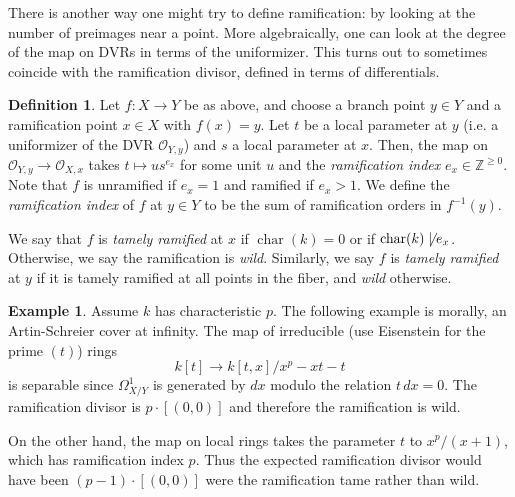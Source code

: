 \documentclass[10pt]{article}
\theoremstyle{definition}
\newtheorem{exmp}[thm]{Example}
\newtheorem{defn}[thm]{Definition}
\DeclareMathOperator{\kchar}{char}
\newcommand{\G}{\mathbb{G}}
\newcommand{\OO}{\mathcal{O}}
\begin{document}
There is another way one might try to define ramification: by looking at the number of preimages near a point.  More algebraically, one can look at the degree of the map on DVRs in terms of the uniformizer.  This turns out to sometimes coincide with the ramification divisor, defined in terms of differentials.
\begin{defn}
Let $f: X \rightarrow Y$ be as above, and choose a branch point $y \in Y$ and a ramification point $x \in X$ with $f(x) = y$.  Let $t$ be a local parameter at $y$ (i.e. a uniformizer of the DVR $\OO_{Y,y}$) and $s$ a local parameter at $x$.  Then, the map on $\OO_{Y,y} \rightarrow \OO_{X,x}$ takes $t \mapsto us^{e_x}$ for some unit $u$ and the \emph{ramification index} $e_x \in \mathbb{Z}^{\geq 0}$.  Note that $f$ is unramified if $e_x = 1$ and ramified if $e_x > 1$.  We define the \emph{ramification index} of $f$ at $y \in Y$ to be the sum of ramification orders in $f^{-1}(y)$.  

We say that $f$ is \emph{tamely ramified} at $x$ if $\kchar(k) = 0$ or if $\kchar(k) \not\mid e_x$.  Otherwise, we say the ramification is \emph{wild}.  Similarly, we say $f$ is \emph{tamely ramified} at $y$ if it is tamely ramified at all points in the fiber, and \emph{wild} otherwise.
\end{defn}


\begin{exmp}
Assume $k$ has characteristic $p$.  The following example is morally, an Artin-Schreier cover at infinity.  The map of irreducible (use Eisenstein for the prime $(t)$) rings 
$$k[t] \rightarrow k[t, x]/x^p - xt - t$$ 
is separable since $\Omega^1_{X/Y}$ is generated by $dx$ modulo the relation $t \, dx = 0$.  The ramification divisor is $p \cdot [(0,0)]$ and therefore the ramification is wild.

On the other hand, the map on local rings takes the parameter $t$ to $x^p/(x+1)$, which has ramification index $p$.  Thus the expected ramification divisor would have been $(p-1) \cdot [(0,0)]$ were the ramification tame rather than wild.
\end{exmp}
\end{document}
